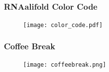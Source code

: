 \begin{frame}[c]\frametitle{RNAalifold Color Code}
  \begin{figure}[htbp]
      \centering
      \texttt{[image: color\_code.pdf]}
  \end{figure}
\end{frame}



\beginbackup

\begin{frame}[c]\frametitle{Coffee Break}
  \begin{figure}[htbp]
    \centering
    \texttt{[image: coffeebreak.png]}
  \end{figure}
\end{frame}

\backupend

